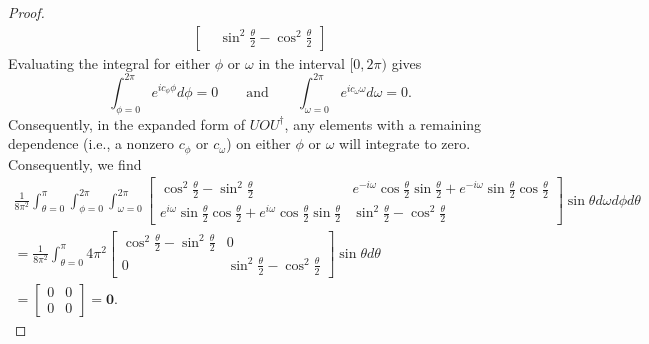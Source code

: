 \begin{proof}
\begin{equation}
\begin{split}
\begin{bmatrix}
            & \sin^{2}{\frac{\theta}{2}} - \cos^{2}{\frac{\theta}{2}}
        \end{bmatrix}
\end{split}
\end{equation}
Evaluating the integral for either $\phi$ or $\omega$ in the interval $[0, 2\pi)$ gives
\begin{equation}
    \int_{\phi = 0}^{2\pi} e^{ic_{\phi} \phi} d\phi = 0 \qquad \text{and} \qquad \int_{\omega = 0}^{2\pi} e^{ic_{\omega} \omega} d\omega = 0.
\end{equation}
Consequently, in the expanded form of $UOU^{\dagger}$, any elements with a remaining dependence (i.e., a nonzero $c_{\phi}$ or $c_{\omega}$) on either $\phi$ or $\omega$ will integrate to zero.
Consequently, we find
\begin{equation}
\begin{split}
    \frac{1}{8\pi^2} \int_{\theta = 0}^{\pi} \int_{\phi = 0}^{2\pi} \int_{\omega = 0}^{2\pi} \begin{bmatrix}
            \cos^{2}{\frac{\theta}{2}} - \sin^{2}{\frac{\theta}{2}}
            & e^{-i \omega} \cos{\frac{\theta}{2}} \sin{\frac{\theta}{2}} + e^{-i\omega} \sin{\frac{\theta}{2}} \cos{\frac{\theta}{2}}\\
            e^{i \omega} \sin{\frac{\theta}{2}} \cos{\frac{\theta}{2}} + e^{i \omega} \cos{\frac{\theta}{2}} \sin{\frac{\theta}{2}}
            & \sin^{2}{\frac{\theta}{2}} - \cos^{2}{\frac{\theta}{2}}
        \end{bmatrix} \sin \theta d\omega d\phi d\theta\\
    = \frac{1}{8\pi^2} \int_{\theta = 0}^{\pi} 4 \pi^{2} \begin{bmatrix}
            \cos^{2}{\frac{\theta}{2}} - \sin^{2}{\frac{\theta}{2}}
            & 0 \\
            0 & \sin^{2}{\frac{\theta}{2}} - \cos^{2}{\frac{\theta}{2}}
        \end{bmatrix} \sin{\theta} d\theta\\
    = \begin{bmatrix} 0 & 0 \\ 0 & 0 \end{bmatrix} = \mathbf{0}.
\end{split}
\end{equation}

\end{proof}
